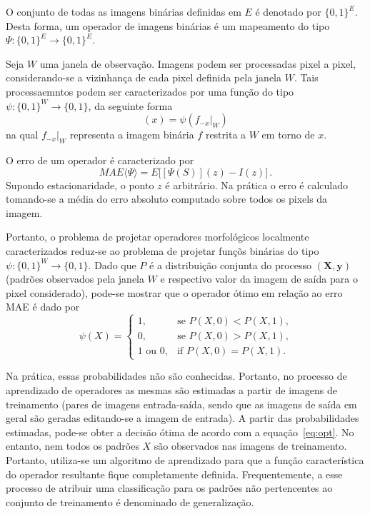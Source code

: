 \documentclass[times, 10pt,twocolumn]{article}
\begin{document}
O conjunto de todas as imagens binárias definidas em $E$ é denotado
por $\{0,1\}^E$. Desta forma, um operador de imagens binárias é um
mapeamento do tipo $\Psi: \{0,1\}^E \to \{0,1\}^E$. 

Seja $W$ uma janela de observação. Imagens podem ser processadas pixel
a pixel, considerando-se a vizinhança de cada pixel definida pela
janela $W$. Tais processaemntos podem ser caracterizados por uma
função do tipo $\psi: \{0,1\}^W \to \{0,1\}$, da seguinte forma
\begin{equation}
[\Psi(f)](x) = \psi(f_{-x}|_W)
\end{equation} 
na qual $f_{-x}|_W$ representa a imagem binária $f$ restrita a $W$ em
torno de $x$.

O erro de um operador é caracterizado por
\begin{equation}
MAE\langle \Psi \rangle = E \big[ [\Psi(S)](z) - I(z) \big]\,.
\end{equation}
Supondo estacionaridade, o ponto $z$ é arbitrário. Na prática o erro é
calculado tomando-se a média do erro absoluto computado sobre
todos os pixels da imagem.

Portanto, o problema de projetar operadores morfológicos localmente
caracterizados reduz-se ao problema de projetar funçõs binárias do
tipo $\psi: \{0,1\}^W \to \{0,1\}$.
Dado que $P$ é a distribuição conjunta do processo
$(\mathbf{X},\mathbf{y})$ (padrões observados pela janela $W$ e
respectivo valor da imagem de saída para o pixel considerado), pode-se
mostrar que o operador ótimo em relação ao erro MAE é dado por
\begin{equation}
\label{eq:opt}
\psi(X) = \left\{
          \begin{array}{ll}
          1, & \mbox{se $P(X,0)<P(X,1)$,}\\
          0, & \mbox{se $P(X,0)>P(X,1)$,}\\
          1 \mbox{ ou } 0, & \mbox{if $P(X,0)=P(X,1)$.}
          \end{array}
\right.
\end{equation}

Na prática, essas probabilidades não são conhecidas. Portanto, no
processo de aprendizado de operadores as mesmas são estimadas a partir
de imagens de treinamento (pares de imagens entrada-saída, sendo que
as imagens de saída em geral são geradas editando-se a imagem de
entrada). A partir das probabilidades estimadas, pode-se obter a
decisão ótima de acordo com a equação~\ref{eq:opt}. No entanto, nem
todos os padrões $X$ são observados nas imagens de
treinamento. Portanto, utiliza-se um algoritmo de aprendizado para que
a função característica do operador resultante fique completamente
definida. Frequentemente, a esse processo de atribuir uma
classificação para os padrões não pertencentes ao conjunto de
treinamento é denominado de generalização.
\end{document}
